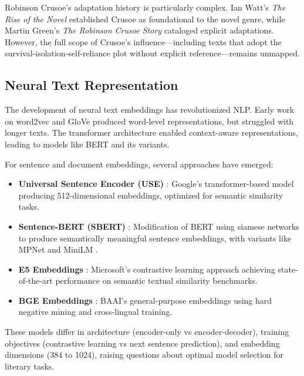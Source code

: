 \documentclass[12pt,a4paper]{article}
\begin{document}
Robinson Crusoe's adaptation history is particularly complex. Ian Watt's \textit{The Rise of the Novel} \cite{Watt2001} established Crusoe as foundational to the novel genre, while Martin Green's \textit{The Robinson Crusoe Story} \cite{Green1990} cataloged explicit adaptations. However, the full scope of Crusoe's influence—including texts that adopt the survival-isolation-self-reliance plot without explicit reference—remains unmapped.

\subsection{Neural Text Representation}

The development of neural text embeddings has revolutionized NLP. Early work on word2vec \cite{Mikolov2013} and GloVe \cite{Pennington2014} produced word-level representations, but struggled with longer texts. The transformer architecture \cite{Vaswani2017} enabled context-aware representations, leading to models like BERT \cite{Devlin2019} and its variants.

For sentence and document embeddings, several approaches have emerged:

\begin{itemize}
    \item \textbf{Universal Sentence Encoder (USE)} \cite{Cer2018}: Google's transformer-based model producing 512-dimensional embeddings, optimized for semantic similarity tasks.

    \item \textbf{Sentence-BERT (SBERT)} \cite{Reimers2019}: Modification of BERT using siamese networks to produce semantically meaningful sentence embeddings, with variants like MPNet \cite{Song2020} and MiniLM \cite{Wang2020}.

    \item \textbf{E5 Embeddings} \cite{Wang2022}: Microsoft's contrastive learning approach achieving state-of-the-art performance on semantic textual similarity benchmarks.

    \item \textbf{BGE Embeddings} \cite{Xiao2023}: BAAI's general-purpose embeddings using hard negative mining and cross-lingual training.
\end{itemize}

These models differ in architecture (encoder-only vs encoder-decoder), training objectives (contrastive learning vs next sentence prediction), and embedding dimensions (384 to 1024), raising questions about optimal model selection for literary tasks.
\end{document}
